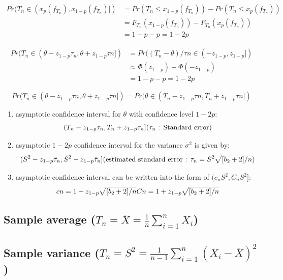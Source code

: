 \[
\begin{aligned}
    Pr(T_n \in (x_p( f_{T_n} ), x_{1-p}( f_{T_n} )]) 
    &= Pr(T_n \leq x_{1-p}( f_{T_n} )) - Pr(T_n \leq x_p( f_{T_n} ))\\
    &= F_{T_n} (x_{1-p}( f_{T_n} )) - F_{T_n} (x_p( f_{T_n} ))\\
    &= 1 - p - p = 1 - 2p
\end{aligned}
\]

\[
\begin{aligned}
    Pr(T_n \in (\theta  - z_{1-p}\tau_n, \theta  + z_{1-p}\tau n]) 
    &= Pr((T_n - \theta  )/\tau n \in (-z_{1-p},z_{1-p}])\\
    &\approx \Phi (z_{1-p}) - \Phi (-z_{1-p})\\
    &= 1 - p - p = 1 - 2p
\end{aligned}
\]

\[
    Pr(T_n \in (\theta  - z_{1-p}\tau n, \theta  + z_{1-p}\tau n]) =
    Pr(\theta  \in (T_n - z_{1-p}\tau n, T_n + z_{1-p}\tau n])
\]

\begin{enumerate}
    \item asymptotic confidence interval for $\theta$ with confidence level $1 - 2p$:
    \[
        (T_n - z_{1-p}\tau_n, T_n + z_{1-p}\tau_n]
        \hfill
        \text{($\tau_n$ : Standard error)}
    \]

    \item asymptotic $1 - 2p$ confidence interval for the variance $\sigma^2$ is given by:
    \[
        (S^2 - z_{1-p}\hat{\tau}_n, S^2 - z_{1-p}\hat{\tau}_n]
        \hfill
        (\text{estimated standard error : } \tau_n = S^2\sqrt{[b_2 + 2]/n})
    \]

    \item asymptotic confidence interval can be written into the form of $(c_n S^2,C_n S^2]$:
    \[
        \hfill
        cn = 1 - z_{1-p}\sqrt{[b_2 + 2]/n} 
        \hfill
        Cn = 1 + z_{1-p}\sqrt{[b_2 + 2]/n} 
        \hfill
    \]
\end{enumerate}


\subsection{Sample average ($T_n = \bar{X} = \frac{1}{n}\sum_{i=1}^{n} X_i $) \cite{ism-1}}

\subsection{Sample variance ($T_n = S^2 = \frac{1}{n-1}\sum_{i=1}^{n} (X_i - \bar{X})^2$) \cite{ism-1}}


